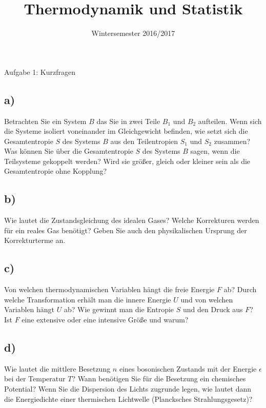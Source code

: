 

\subject{TuS}
\title{Thermodynamik und Statistik}
\date{
    Wintersemester 2016/2017
}



\maketitle
\thispagestyle{empty}
\newpage


\begin{aufgabe}{Aufgabe 1: Kurzfragen}
    \subsection{a)}
    Betrachten Sie ein System $B$ das Sie in zwei Teile $B_1$ und $B_2$ aufteilen.
    Wenn sich die Systeme isoliert voneinander im Gleichgewicht befinden,
    wie setzt sich die Gesamtentropie $S$ des Systems $B$ aus den Teilentropien $S_1$ und $S_2$ zusammen?
    Was können Sie über die Gesamtentropie $S$ des Systems $B$ sagen,
    wenn die Teilsysteme gekoppelt werden?
    Wird sie größer, gleich oder kleiner sein als die Gesamtentropie ohne Kopplung?

    \subsection{b)}
    Wie lautet die Zustandsgleichung des idealen Gases?
    Welche Korrekturen werden für ein reales Gas benötigt?
    Geben Sie auch den physikalischen Ursprung der Korrekturterme an.


    \subsection{c)}
    Von welchen thermodynamischen Variablen hängt die freie Energie $F$ ab?
    Durch welche Transformation erhält man die innere Energie $U$ und von welchen Variablen hängt $U$ ab?
    Wie gewinnt man die Entropie $S$ und den Druck aus $F$?
    Ist $F$ eine extensive oder eine intensive Größe und warum?

    \subsection{d)}
    Wie lautet die mittlere Besetzung $n$ eines bosonischen Zustands mit der Energie $\epsilon$ bei der Temperatur $T$?
    Wann benötigen Sie für die Besetzung ein chemisches Potential?
    Wenn Sie die Dispersion des Lichts zugrunde legen,
    wie lautet dann die Energiedichte einer thermischen Lichtwelle (Plancksches Strahlungsgesetz)?


\end{aufgabe}
